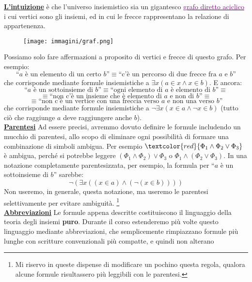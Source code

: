 \documentclass[11pt]{scrartcl}
\begin{document}
\textbf{\underline{L'intuizione}} è che l'universo insiemistico sia un gigantesco \href{https://it.wikipedia.org/wiki/Digrafo_aciclico}{\textcolor{purple}{grafo diretto aciclico}} i cui vertici sono gli insiemi,
ed in cui le frecce rappresentano la relazione di appartenenza.

\begin{center}
	\begin{figure}[h]
		\centering
		\texttt{[image: immagini/graf.png]}
	\end{figure}
\end{center}

Possiamo solo fare affermazioni a proposito di vertici e frecce di questo grafo. Per esempio:
\[ \text{``$a$ è un elemento di un certo $b$''} \equiv \text{``c'è un percorso di due frecce fra $a$ e $b$''} 
	\]
che corrisponde mediante formule insiemistiche a $ \exists x (a \in x \land x \in b)$. E ancora:
\[\text{``$a$ è un sottoinsieme di $b$''} \equiv \text{``ogni elemento di $a$ è elemento di $b$''} \equiv \]\[
		\equiv\text{``non c'è un insieme che è elemento di $a$ e non di $b$''}\equiv\]\[
	 \equiv \text{``non c'è un vertice con una freccia verso $a$ e non una verso $b$''}
	\]
che corrisponde mediante formule insiemistiche a $\neg\exists x (x \in a \land \neg x \in b)$ (tutto ciò che raggiunge $a$ deve raggiungere anche $b$).\\
\textbf{\underline{Parentesi}} Ad essere precisi, avremmo dovuto definire le formule includendo un mucchio di parentesi, allo scopo di eliminare ogni possibilità
di formare una combinazione di simboli ambigua. Per esempio $\textcolor{red}{\Phi_1 \land \Phi_2 \lor \Phi_3}$ è ambigua, perché si potrebbe leggere $(\Phi_1 \land \Phi_2) \lor \Phi_3$
o $\Phi_1 \land (\Phi_2 \lor \Phi_3)$. In una notazione completamente parentesizzata, per esempio, la formula per ``$a$ è un sottoinsieme di $b$'' sarebbe:
\[ \neg(\exists x((x \in a)\land(\neg(x \in b))))
	\]
Non useremo, in generale, questa notazione, ma useremo le parentesi selettivamente per evitare ambiguità. \footnote{Mi riservo in queste dispense di modificare un pochino questa regola, qualora alcune formule risultassero più leggibili con le parentesi.}\\
\textbf{\underline{Abbreviazioni}} Le formule appena descritte costituiscono il linguaggio della teoria degli insiemi \textbf{puro}. Durante il corso estenderemo
più volte questo linguaggio mediante abbreviazioni, che semplicemente rimpiazzano formule più lunghe con scritture convenzionali più compatte, e quindi non alterano 
\end{document}
